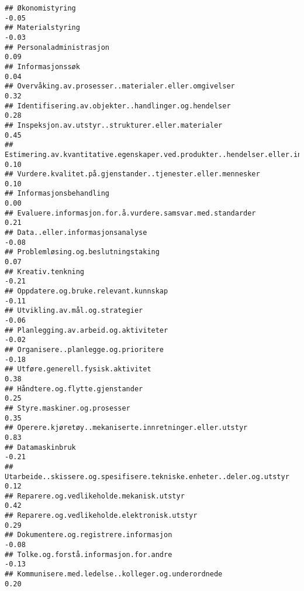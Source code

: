 \documentclass[
]{article}
\begin{document}
\begin{verbatim}
## Økonomistyring                                                                   -0.05
## Materialstyring                                                                  -0.03
## Personaladministrasjon                                                            0.09
## Informasjonssøk                                                                   0.04
## Overvåking.av.prosesser..materialer.eller.omgivelser                              0.32
## Identifisering.av.objekter..handlinger.og.hendelser                               0.28
## Inspeksjon.av.utstyr..strukturer.eller.materialer                                 0.45
## Estimering.av.kvantitative.egenskaper.ved.produkter..hendelser.eller.informasjon  0.10
## Vurdere.kvalitet.på.gjenstander..tjenester.eller.mennesker                        0.10
## Informasjonsbehandling                                                            0.00
## Evaluere.informasjon.for.å.vurdere.samsvar.med.standarder                         0.21
## Data..eller.informasjonsanalyse                                                  -0.08
## Problemløsing.og.beslutningstaking                                                0.07
## Kreativ.tenkning                                                                 -0.21
## Oppdatere.og.bruke.relevant.kunnskap                                             -0.11
## Utvikling.av.mål.og.strategier                                                   -0.06
## Planlegging.av.arbeid.og.aktiviteter                                             -0.02
## Organisere..planlegge.og.prioritere                                              -0.18
## Utføre.generell.fysisk.aktivitet                                                  0.38
## Håndtere.og.flytte.gjenstander                                                    0.25
## Styre.maskiner.og.prosesser                                                       0.35
## Operere.kjøretøy..mekaniserte.innretninger.eller.utstyr                           0.83
## Datamaskinbruk                                                                   -0.21
## Utarbeide..skissere.og.spesifisere.tekniske.enheter..deler.og.utstyr              0.12
## Reparere.og.vedlikeholde.mekanisk.utstyr                                          0.42
## Reparere.og.vedlikeholde.elektronisk.utstyr                                       0.29
## Dokumentere.og.registrere.informasjon                                            -0.08
## Tolke.og.forstå.informasjon.for.andre                                            -0.13
## Kommunisere.med.ledelse..kolleger.og.underordnede                                 0.20

\end{verbatim}
\end{document}
